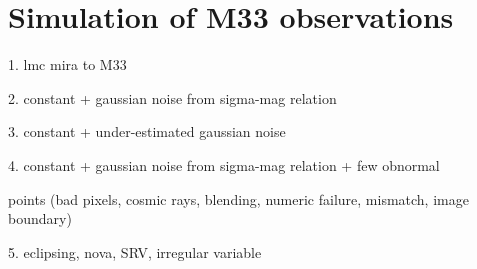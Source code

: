 \section{Simulation of M33 observations} \label{sec.simulation}

1. lmc mira to M33

2. constant + gaussian noise from sigma-mag relation

3. constant + under-estimated gaussian noise 

4. constant + gaussian noise from sigma-mag relation + few obnormal

points (bad pixels, cosmic rays, blending, numeric failure, mismatch,
image boundary)

5. eclipsing, nova, SRV, irregular variable

